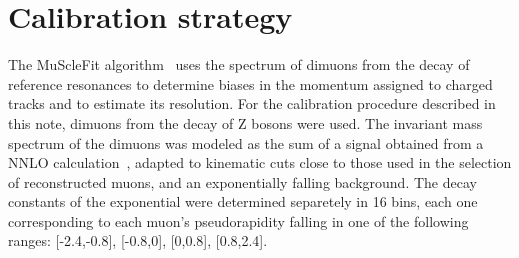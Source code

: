 \section{Calibration strategy}
The MuScleFit algorithm~\cite{CMS_AN_2010-059} uses the spectrum of dimuons from the decay of
reference resonances to determine biases in the momentum assigned to
charged tracks and to estimate its resolution.
For the calibration procedure described in this note, dimuons from the decay of
Z bosons were used. 
The invariant mass spectrum of the dimuons 
was modeled as the sum of a signal obtained from a NNLO
calculation~\cite{Dittmaier:2009cr}, adapted to kinematic cuts close to
those used in the selection of reconstructed muons, and an
exponentially falling background. The decay constants of the
exponential were determined separetely in 16 bins, each one corresponding to each 
muon's pseudorapidity falling in one of the following ranges: [-2.4,-0.8], [-0.8,0], 
[0,0.8], [0.8,2.4].
